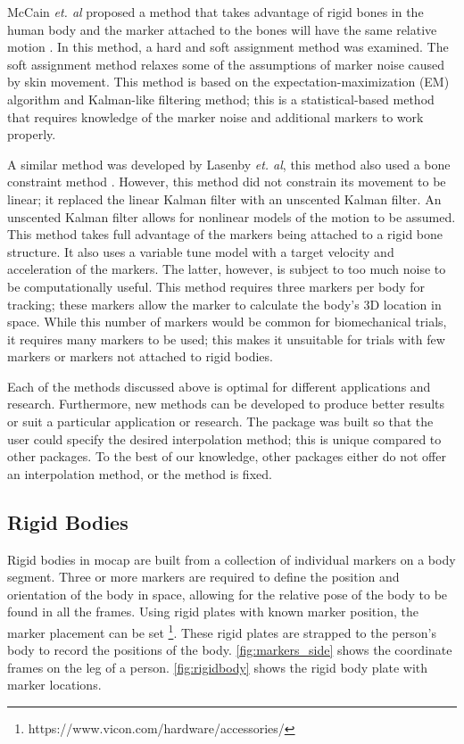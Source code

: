 McCain \textit{et. al} proposed a method that takes advantage of rigid bones in the human body and the marker attached to the bones will have the same relative motion \cite{li2010bolero}. In this method, a hard and soft assignment method was examined. The soft assignment method relaxes some of the assumptions of marker noise caused by skin movement. This method is based on the expectation-maximization (EM) algorithm and Kalman-like filtering method; this is a statistical-based method that requires knowledge of the marker noise and additional markers to work properly. 

A similar method was developed by Lasenby \textit{et. al}, this method also used a bone constraint method \cite{aristidou2013real}. However, this method did not constrain its movement to be linear; it replaced the linear Kalman filter with an unscented Kalman filter. An unscented Kalman filter allows for nonlinear models of the motion to be assumed. This method takes full advantage of the markers being attached to a rigid bone structure. It also uses a variable tune model with a target velocity and acceleration of the markers. The latter, however, is subject to too much noise to be computationally useful. This method requires three markers per body for tracking; these markers allow the marker to calculate the body's 3D location in space. While this number of markers would be common for biomechanical trials, it requires many markers to be used; this makes it unsuitable for trials with few markers or markers not attached to rigid bodies.

Each of the methods discussed above is optimal for different applications and research. Furthermore, new methods can be developed to produce better results or suit a particular application or research. The package was built so that the user could specify the desired interpolation method; this is unique compared to other packages. To the best of our knowledge, other packages either do not offer an interpolation method, or the method is fixed.  

\subsection{Rigid Bodies}

Rigid bodies in mocap are built from a collection of individual markers on a body segment. Three or more markers are required to define the position and orientation of the body in space, allowing for the relative pose of the body to be found in all the frames. Using rigid plates with known marker position, the marker placement can be set \footnote{https://www.vicon.com/hardware/accessories/}. These rigid plates are strapped to the person's body to record the positions of the body. \autoref{fig:markers_side} shows the coordinate frames on the leg of a person. \autoref{fig:rigidbody} shows the rigid body plate with marker locations. 

